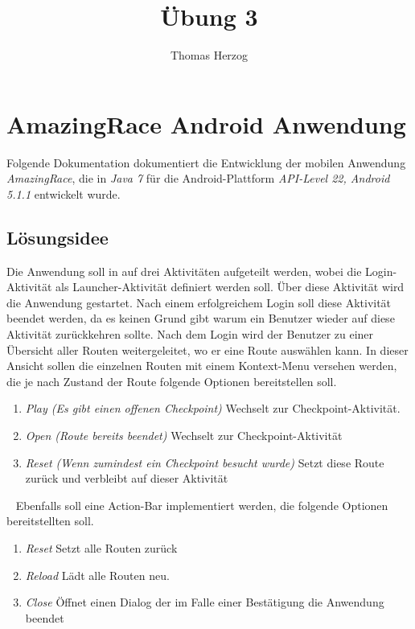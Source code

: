 \documentclass[11pt, a4paper, twoside]{article}   	%
\title{Übung 3}
\author{Thomas Herzog}
\begin{document}
\setlength{\headheight}{15mm}
%
{\color{myred}
	\section
		{AmazingRace Android Anwendung}
}
Folgende Dokumentation dokumentiert die Entwicklung der mobilen Anwendung \emph{AmazingRace}, die in \emph{Java 7} für die Android-Plattform \emph{API-Level 22, Android 5.1.1} entwickelt wurde.
\newline

\subsection{Lösungsidee}
Die Anwendung soll in auf drei Aktivitäten aufgeteilt werden, wobei die Login-Aktivität als Launcher-Aktivität definiert werden soll. Über diese Aktivität wird die Anwendung gestartet. Nach einem erfolgreichem Login soll diese Aktivität beendet werden, da es keinen Grund gibt warum ein Benutzer wieder auf diese Aktivität zurückkehren sollte.
\newline
\newline
Nach dem Login wird der Benutzer zu einer Übersicht aller Routen weitergeleitet, wo er eine Route auswählen kann. In dieser Ansicht sollen die einzelnen Routen mit einem Kontext-Menu versehen werden, die je nach Zustand der Route folgende Optionen bereitstellen soll.
\begin{enumerate}
	\item\emph{Play (Es gibt einen offenen Checkpoint)}
	\newline
	Wechselt zur Checkpoint-Aktivität.
	\item\emph{Open (Route bereits beendet)}
	\newline
	Wechselt zur Checkpoint-Aktivität
	\item\emph{Reset (Wenn zumindest ein Checkpoint besucht wurde)}
	\newline
	Setzt diese Route zurück und verbleibt auf dieser Aktivität	
\end{enumerate}
\ \newline
Ebenfalls soll eine Action-Bar implementiert werden, die folgende Optionen bereitstellten soll.
\begin{enumerate}
	\item\emph{Reset}
	\newline
	Setzt alle Routen zurück
	\item\emph{Reload}
	\newline
	Lädt alle Routen neu.
	\item\emph{Close}
	\newline
	Öffnet einen Dialog der im Falle einer Bestätigung die Anwendung beendet
\end{enumerate} 
\end{document}
